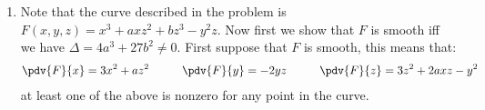 \begin{enumerate}[label=]
    \item 
        Note that the curve described in the problem is $F(x, y, z) = x^3 + axz^2 + bz^3 - y^2z$. Now first we show that $F$ is smooth iff we have $\Delta = 4a^3 + 27 b^2 \ne 0$. First suppose that $F$ is smooth, this means that:
        \begin{gather*}
                \pdv{F}{x} = 3x^2 + az^2 \hspace{1cm}
                \pdv{F}{y} = -2yz \hspace{1cm}
                \pdv{F}{z} = 3z^2 + 2axz - y^2 
        \end{gather*}
        at least one of the above is nonzero for any point in the curve.
\end{enumerate}